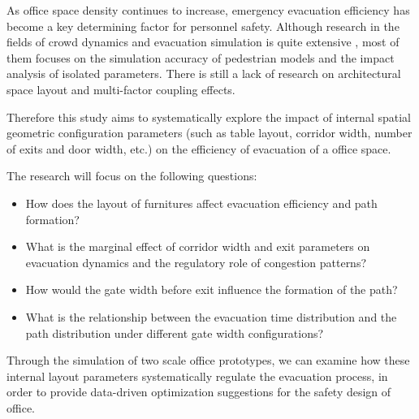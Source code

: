 As office space density continues to increase, emergency evacuation efficiency has become a key determining factor for personnel safety. Although research in the fields of crowd dynamics and evacuation simulation is quite extensive \cite{gwynneReviewMethodologiesUsed1999}, most of them focuses on the simulation accuracy of pedestrian models and the impact analysis of isolated parameters. There is still a lack of research on architectural space layout and multi-factor coupling effects.

Therefore this study aims to systematically explore the impact of internal spatial geometric configuration parameters (such as table layout, corridor width, number of exits and door width, etc.) on the efficiency of evacuation of a office space. 

The research will focus on the following questions: 
\begin{itemize}
    \item How does the layout of furnitures affect evacuation efficiency and path formation?
    \item What is the marginal effect of corridor width and exit parameters on evacuation dynamics and the regulatory role of congestion patterns?
    \item How would the gate width before exit influence the formation of the path?
    \item What is the relationship between the evacuation time distribution and the path distribution under different gate width configurations?
\end{itemize}

Through the simulation of two scale office prototypes, we can examine how these internal layout parameters systematically regulate the evacuation process, in order to provide data-driven optimization suggestions for the safety design of office.